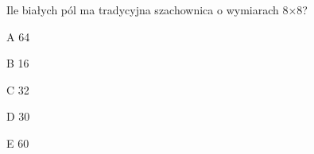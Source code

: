 \begin{tresc}
Ile białych pól ma tradycyjna szachownica o wymiarach 8×8?
\end{tresc}
\begin{wariant}{A} 64 \end{wariant}
\begin{wariant}{B} 16 \end{wariant}
\begin{wariant}{C} 32 \end{wariant}
\begin{wariant}{D} 30 \end{wariant}
\begin{wariant}{E} 60 \end{wariant}

